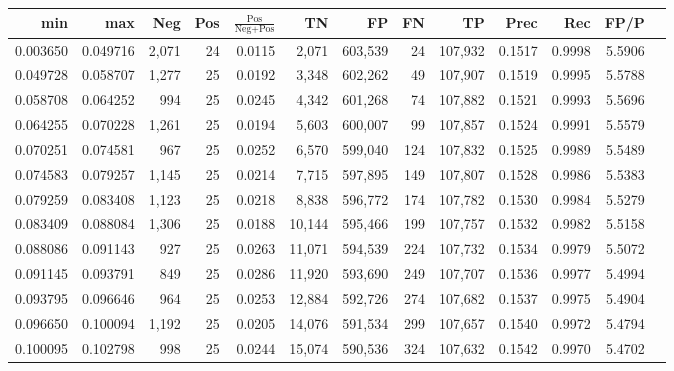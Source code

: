 \begin{tabular}{rrrrrrrrrrrrr}
\toprule
     min &      max &   Neg & Pos & $\frac{\text{Pos}}{\text{Neg}+\text{Pos}}$ &      TN &      FP &      FN &      TP &   Prec &    Rec &   FP/P \\
\midrule
0.003650 & 0.049716 & 2,071 &  24 &                                     0.0115 &   2,071 & 603,539 &      24 & 107,932 & 0.1517 & 0.9998 & 5.5906 \\
0.049728 & 0.058707 & 1,277 &  25 &                                     0.0192 &   3,348 & 602,262 &      49 & 107,907 & 0.1519 & 0.9995 & 5.5788 \\
0.058708 & 0.064252 &   994 &  25 &                                     0.0245 &   4,342 & 601,268 &      74 & 107,882 & 0.1521 & 0.9993 & 5.5696 \\
0.064255 & 0.070228 & 1,261 &  25 &                                     0.0194 &   5,603 & 600,007 &      99 & 107,857 & 0.1524 & 0.9991 & 5.5579 \\
0.070251 & 0.074581 &   967 &  25 &                                     0.0252 &   6,570 & 599,040 &     124 & 107,832 & 0.1525 & 0.9989 & 5.5489 \\
0.074583 & 0.079257 & 1,145 &  25 &                                     0.0214 &   7,715 & 597,895 &     149 & 107,807 & 0.1528 & 0.9986 & 5.5383 \\
0.079259 & 0.083408 & 1,123 &  25 &                                     0.0218 &   8,838 & 596,772 &     174 & 107,782 & 0.1530 & 0.9984 & 5.5279 \\
0.083409 & 0.088084 & 1,306 &  25 &                                     0.0188 &  10,144 & 595,466 &     199 & 107,757 & 0.1532 & 0.9982 & 5.5158 \\
0.088086 & 0.091143 &   927 &  25 &                                     0.0263 &  11,071 & 594,539 &     224 & 107,732 & 0.1534 & 0.9979 & 5.5072 \\
0.091145 & 0.093791 &   849 &  25 &                                     0.0286 &  11,920 & 593,690 &     249 & 107,707 & 0.1536 & 0.9977 & 5.4994 \\
0.093795 & 0.096646 &   964 &  25 &                                     0.0253 &  12,884 & 592,726 &     274 & 107,682 & 0.1537 & 0.9975 & 5.4904 \\
0.096650 & 0.100094 & 1,192 &  25 &                                     0.0205 &  14,076 & 591,534 &     299 & 107,657 & 0.1540 & 0.9972 & 5.4794 \\
0.100095 & 0.102798 &   998 &  25 &                                     0.0244 &  15,074 & 590,536 &     324 & 107,632 & 0.1542 & 0.9970 & 5.4702 \\

\end{tabular}
